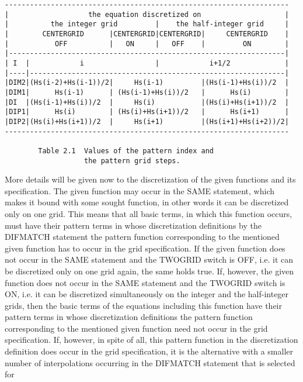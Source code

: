 \begin{verbatim}
--------------------------------------------------------------------
|                   the equation discretized on                    |
|          the integer grid         |    the half-integer grid     |
|        CENTERGRID      |CENTERGRID|CENTERGRID|     CENTERGRID    |
|           OFF          |   ON     |   OFF    |         ON        |
|------------------------------------------------------------------|
| I  |            i                 |            i+1/2             |
|----|-------------------------------------------------------------|
|DIM2|(Hs(i-2)+Hs(i-1))/2|     Hs(i-1)         |(Hs(i-1)+Hs(i))/2  |
|DIM1|      Hs(i-1)      | (Hs(i-1)+Hs(i))/2   |      Hs(i)        |
|DI  |(Hs(i-1)+Hs(i))/2  |     Hs(i)           |(Hs(i)+Hs(i+1))/2  |
|DIP1|      Hs(i)        | (Hs(i)+Hs(i+1))/2   |      Hs(i+1)      |
|DIP2|(Hs(i)+Hs(i+1))/2  |     Hs(i+1)         |(Hs(i+1)+Hs(i+2))/2|
--------------------------------------------------------------------

        Table 2.1  Values of the pattern index and
                   the pattern grid steps.
\end{verbatim}
     More details  will be  given now to the discretization of the given
functions and  its specification.  The given  function may  occur in the
SAME statement, which makes it bound with some sought function, in other
words it can be discretized only on one grid. This means that  all basic
terms, in  which this  function occurs, must have their pattern terms in
whose discretization definitions by  the DIFMATCH  statement the pattern
function corresponding  to the  mentioned given function has to occur in
the grid specification. If the given function does not occur in the SAME
statement and the TWOGRID switch is OFF, i.e. it can be discretized only
on one grid again, the same holds true. If, however,  the given function
does not  occur in the SAME statement and the TWOGRID switch is ON, i.e.
it can be discretized simultaneously on the integer and the half-integer
grids, then  the basic  terms of  the equations  including this function
have their pattern terms in whose discretization definitions the pattern
function corresponding to the mentioned given function need not occur in
the grid specification.  If, however,  in  spite  of  all,  this pattern
function  in  the  discretization  definition  does  occur  in  the grid
specification,  it  is  the  alternative  with   a  smaller   number  of
interpolations occurring  in the DIFMATCH statement that is selected for
